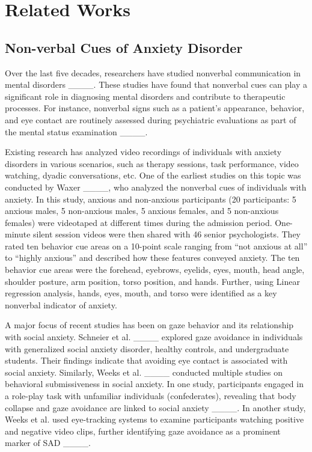 \section{Related Works}
\label{section: RW}

\subsection{Non-verbal Cues of Anxiety Disorder}
Over the last five decades, researchers have studied nonverbal communication in mental disorders ____. These studies have found that nonverbal cues can play a significant role in diagnosing mental disorders and contribute to therapeutic processes. For instance, nonverbal signs such as a patient’s appearance, behavior, and eye contact are routinely assessed during psychiatric evaluations as part of the mental status examination ____.

Existing research has analyzed video recordings of individuals with anxiety disorders in various scenarios, such as therapy sessions, task performance, video watching, dyadic conversations, etc. One of the earliest studies on this topic was conducted by Waxer ____, who analyzed the nonverbal cues of individuals with anxiety. In this study, anxious and non-anxious participants (20 participants: 5 anxious males, 5 non-anxious males, 5 anxious females, and 5 non-anxious females) were videotaped at different times during the admission period. One-minute silent session videos were then shared with 46 senior psychologists. They rated ten behavior cue areas on a 10-point scale ranging from ``not anxious at all'' to ``highly anxious'' and described how these features conveyed anxiety. The ten behavior cue areas were the forehead, eyebrows, eyelids, eyes, mouth, head angle, shoulder posture, arm position, torso position, and hands. Further, using Linear regression analysis, hands, eyes, mouth, and torso were identified as a key nonverbal indicator of anxiety.

A major focus of recent studies has been on gaze behavior and its relationship with social anxiety. Schneier et al. ____ explored gaze avoidance in individuals with generalized social anxiety disorder, healthy controls, and undergraduate students. Their findings indicate that avoiding eye contact is associated with social anxiety. Similarly, Weeks et al. ____ conducted multiple studies on behavioral submissiveness in social anxiety. In one study, participants engaged in a role-play task with unfamiliar individuals (confederates), revealing that body collapse and gaze avoidance are linked to social anxiety ____. In another study, Weeks et al. used eye-tracking systems to examine participants watching positive and negative video clips, further identifying gaze avoidance as a prominent marker of SAD ____.

